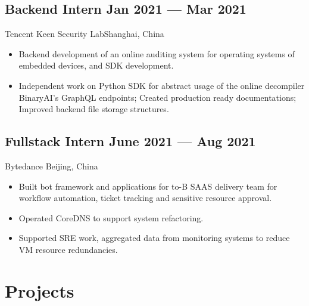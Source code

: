 \documentclass[a4,10pt]{article}
\newcommand{\subtext}[1]{
#1\par\vspace{-0.2cm}}
\newenvironment{zitemize}{
\begin{itemize}\itemsep0pt \parskip0pt \parsep1pt}
{\end{itemize}\vspace{-0.5cm}}
\begin{document}
\subsection*{Backend Intern \hfill Jan 2021 --- Mar 2021} 
\subtext{Tencent Keen Security Lab\hfill Shanghai, China} 
    \begin{zitemize}
        \item Backend development of an online auditing system for operating systems of embedded devices, and SDK development. 
        \item Independent work on Python SDK for abstract usage of the online decompiler BinaryAI's GraphQL endpoints; Created production ready documentations; Improved backend file storage structures.
    \end{zitemize}


\subsection*{Fullstack Intern \hfill June 2021 --- Aug 2021} 
\subtext{Bytedance \hfill Beijing, China} 
    \begin{zitemize}
        \item Built bot framework and applications for to-B SAAS delivery team for workflow automation, ticket tracking and sensitive resource approval.
        \item Operated CoreDNS to support system refactoring.
        \item Supported SRE work, aggregated data from monitoring systems to reduce VM resource redundancies. 
    \end{zitemize}





\section{Projects} %
\end{document}
